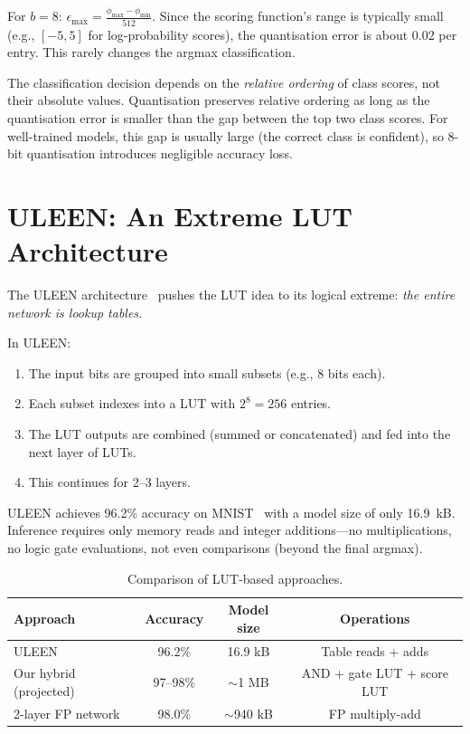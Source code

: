 For $b = 8$: $\epsilon_{\max} = \frac{\phi_{\max} - \phi_{\min}}{512}$.
Since the scoring function's range is typically small (e.g., $[-5, 5]$
for log-probability scores), the quantisation error is about 0.02 per
entry. This rarely changes the argmax classification.

\begin{keyinsight}
The classification decision depends on the \emph{relative ordering}
of class scores, not their absolute values. Quantisation preserves
relative ordering as long as the quantisation error is smaller than
the gap between the top two class scores. For well-trained models,
this gap is usually large (the correct class is confident), so 8-bit
quantisation introduces negligible accuracy loss.
\end{keyinsight}


\section{ULEEN: An Extreme LUT Architecture}
\label{sec:uleen}

The ULEEN architecture~\cite{susskind2024uleen} pushes the LUT idea
to its logical extreme: \emph{the entire network is lookup tables.}

In ULEEN:
\begin{enumerate}
  \item The input bits are grouped into small subsets (e.g., 8 bits
    each).
  \item Each subset indexes into a LUT with $2^8 = 256$ entries.
  \item The LUT outputs are combined (summed or concatenated) and
    fed into the next layer of LUTs.
  \item This continues for 2--3 layers.
\end{enumerate}

ULEEN achieves 96.2\% accuracy on MNIST~\cite{lecun1998mnist} with a model size of only
16.9~kB. Inference requires only memory reads and integer
additions---no multiplications, no logic gate evaluations, not even
comparisons (beyond the final argmax).

\begin{table}[htbp]
\centering
\caption{Comparison of LUT-based approaches.}
\label{tab:lut-comparison}
\begin{tabular}{@{}lccc@{}}
  \toprule
  \textbf{Approach} & \textbf{Accuracy} & \textbf{Model size}
    & \textbf{Operations} \\
  \midrule
  ULEEN~\cite{susskind2024uleen} & 96.2\% & 16.9 kB & Table reads + adds \\
  Our hybrid (projected) & 97--98\% & $\sim$1 MB & AND + gate LUT + score LUT \\
  2-layer FP network & 98.0\% & $\sim$940 kB & FP multiply-add \\
  \bottomrule
\end{tabular}
\end{table}

